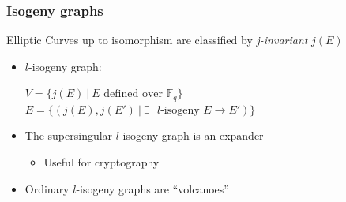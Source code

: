 \documentclass{beamer}
\newcommand{\F}{\mathbb{F}}
\begin{document}
\begin{frame}
    \frametitle{Isogeny graphs}
    Elliptic Curves up to isomorphism are classified by \emph{j-invariant} $j(E)$
    \begin{itemize}[<+->]
        \item $l$-isogeny graph: \begin{minipage}[t]{0.6\textwidth}
            $V = \{ j(E) \ | \ \text{$E$ defined over $\F_q$} \}$\\
            $E = \{ (j(E), j(E') \ | \ \text{$\exists$ $l$-isogeny $E \to E'$}) \}$
        \end{minipage}
        \item The supersingular $l$-isogeny graph is an expander
        \begin{itemize}
            \item Useful for cryptography
        \end{itemize}
        \item Ordinary $l$-isogeny graphs are ``volcanoes''
    \end{itemize}
\end{frame}
\end{document}
